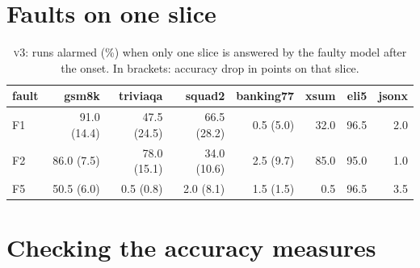 \documentclass[11pt]{article}
\newcommand{\vthree}{\textsc{v3}}
\begin{document}
\section{Faults on one slice}
\begin{table}[h]
  \centering\small
  \caption{\vthree{}: runs alarmed (\%) when only one slice is answered by the
  faulty model after the onset. In brackets: accuracy drop in points on that slice.}
  \begin{tabular}{lrrrrrrr}
    \toprule
    fault & gsm8k & triviaqa & squad2 & banking77 & xsum & eli5 & jsonx \\
    \midrule
    F1 & 91.0 (14.4) & 47.5 (24.5) & 66.5 (28.2) & 0.5 (5.0) & 32.0 & 96.5 & 2.0 \\
    F2 & 86.0 (7.5) & 78.0 (15.1) & 34.0 (10.6) & 2.5 (9.7) & 85.0 & 95.0 & 1.0 \\
    F5 & 50.5 (6.0) & 0.5 (0.8) & 2.0 (8.1) & 1.5 (1.5) & 0.5 & 96.5 & 3.5 \\
    \bottomrule
  \end{tabular}
\end{table}

\clearpage
\section{Checking the accuracy measures}
\end{document}
